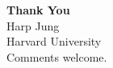 \documentclass[aspectratio=169,12pt]{beamer}
\begin{document}
\section{}

\begin{frame}{}
\begin{center}
\vspace{2em}
\Large\textbf{Thank You}\\[1em]
\normalsize
Harp Jung\\
Harvard University\\[1em]
\small\textcolor{harvardgray}{Comments welcome.}
\end{center}
\end{frame}
\end{document}
